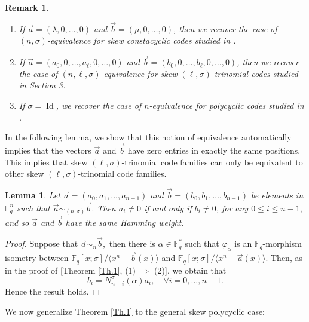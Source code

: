 \documentclass[12pt,paper]{article}
\theoremstyle{plain}
\newtheorem{lemma}[theorem]{Lemma} %
\newtheorem{remark}[theorem]{Remark}
\newcommand{\Fq}{\mathbb{F}_{q}}
\DeclareMathOperator{\id}{Id}
\begin{document}
\begin{remark}
 \begin{enumerate}
     \item  If $ \vec{a} = (\lambda, 0, \ldots, 0) $ and $ \vec{b} = (\mu, 0, \ldots, 0) $, then we recover the case of $(n,\sigma)$-equivalence for skew constacyclic codes studied in \cite{Ouazzou2025}.
     \item  If $ \vec{a} = (a_0, 0, \ldots,a_{\ell},0,\ldots, 0) $ and  $ \vec{b} = (b_0, 0, \ldots,b_{\ell},0,\ldots, 0) $, then we recover the case of $(n,\ell,\sigma)$-equivalence for  skew  $(\ell,\sigma)$-trinomial  codes studied in Section 3.
     \item If $\sigma=\id$, we recover  the case of $n$-equivalence for   polycyclic   codes studied in \cite{Equiv2025}.
     \end{enumerate}
 \end{remark}

 In the following lemma, we show that this notion of equivalence automatically implies that the vectors $\vec{a}$ and $\vec{b}$ have zero entries in exactly the same positions. This implies that skew  $(\ell,\sigma)$-trinomial code families can only be equivalent to other skew $(\ell,\sigma)$-trinomial code families.
 
 \begin{lemma}
    Let $ \vec{a} = (a_0, a_1, \ldots, a_{n-1}) $ and $ \vec{b} = (b_0, b_1, \ldots, b_{n-1}) $ be elements in $\mathbb{F}_q^n $ such that  $ \vec{a} \sim_{(n,\sigma)}\vec{b} $. Then $ a_i \neq 0 $ if and only if $ b_i \neq 0 $, for any $ 0\leq  i\leq n-1,$  and so $\vec{a}$ and $\vec{b}$ have the same Hamming weight.
 \end{lemma}
\begin{proof}
Suppose that $ \vec{a} \sim_n \vec{b},$ then there is $\alpha \in \Fq^*$ such that $ \varphi_{\alpha}$ is an $\mathbb{F}_q$-morphism isometry between $ \Fq[x;\sigma] /\langle x^n-\vec{b}(x) \rangle $  and $ \Fq[x;\sigma] /\langle x^n-\vec{a}(x) \rangle$. Then, as in the proof of [Theorem \ref{Th.1}, (1) $\Rightarrow$ (2)], we obtain that 
$$ b_i = N_{n-i}^{\sigma}(\alpha) a_i, \quad \forall i=0, \ldots, n-1.$$
Hence the result holds.
    
\end{proof}

We now generalize Theorem \ref{Th.1} to the general skew polycyclic case: 
\end{document}
